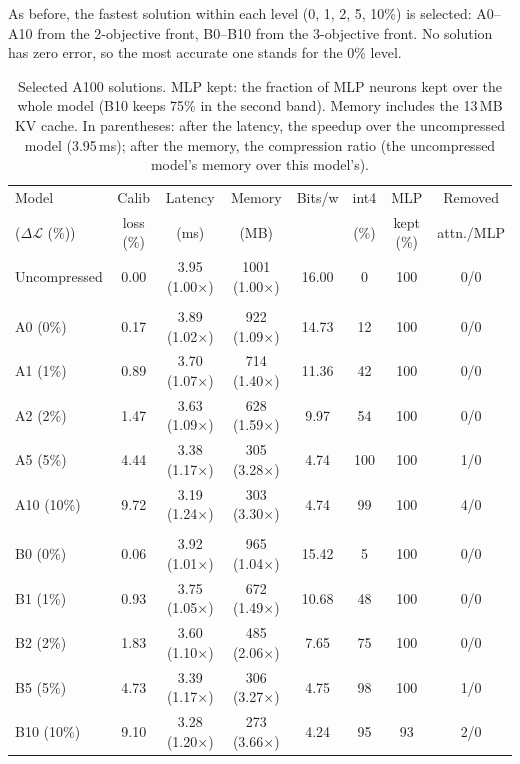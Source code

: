 \documentclass[11pt]{article}
\newcommand{\dloss}{\Delta\mathcal{L}}
\begin{document}
As before, the fastest solution within each level (0, 1, 2, 5, 10\%) is selected: A0--A10 from the
2-objective front, B0--B10 from the 3-objective front. No solution has zero error, so the most accurate
one stands for the 0\% level.

\begin{table}[!ht]
\centering
\scriptsize
\setlength{\tabcolsep}{3pt}
\begin{tabular}{lccccccc}
\toprule
Model & Calib & Latency & Memory & Bits/w & int4 & MLP & Removed \\
($\dloss$ (\%)) & loss (\%) & (ms) & (MB) & & (\%) & kept (\%) & attn./MLP \\
\midrule
Uncompressed & 0.00 & 3.95 (1.00$\times$) & 1001 (1.00$\times$) & 16.00 & 0 & 100 & 0/0 \\
\addlinespace
\multicolumn{8}{l}{\emph{2 objectives}} \\
A0  (0\%)  & 0.17 & 3.89 (1.02$\times$) & 922 (1.09$\times$) & 14.73 & 12  & 100 & 0/0 \\
A1  (1\%)  & 0.89 & 3.70 (1.07$\times$) & 714 (1.40$\times$) & 11.36 & 42  & 100 & 0/0 \\
A2  (2\%)  & 1.47 & 3.63 (1.09$\times$) & 628 (1.59$\times$) & 9.97  & 54  & 100 & 0/0 \\
A5  (5\%)  & 4.44 & 3.38 (1.17$\times$) & 305 (3.28$\times$) & 4.74  & 100 & 100 & 1/0 \\
A10 (10\%) & 9.72 & 3.19 (1.24$\times$) & 303 (3.30$\times$) & 4.74  & 99  & 100 & 4/0 \\
\addlinespace
\multicolumn{8}{l}{\emph{3 objectives}} \\
B0  (0\%)  & 0.06 & 3.92 (1.01$\times$) & 965 (1.04$\times$) & 15.42 & 5   & 100 & 0/0 \\
B1  (1\%)  & 0.93 & 3.75 (1.05$\times$) & 672 (1.49$\times$) & 10.68 & 48  & 100 & 0/0 \\
B2  (2\%)  & 1.83 & 3.60 (1.10$\times$) & 485 (2.06$\times$) & 7.65  & 75  & 100 & 0/0 \\
B5  (5\%)  & 4.73 & 3.39 (1.17$\times$) & 306 (3.27$\times$) & 4.75  & 98  & 100 & 1/0 \\
B10 (10\%) & 9.10 & 3.28 (1.20$\times$) & 273 (3.66$\times$) & 4.24  & 95  & 93  & 2/0 \\
\bottomrule
\end{tabular}
\caption{Selected A100 solutions. MLP kept: the fraction of MLP neurons kept over the whole model (B10
keeps 75\% in the second band). Memory includes the 13\,MB KV cache. In parentheses: after the latency, the
speedup over the uncompressed model (3.95\,ms); after the memory, the compression ratio (the uncompressed
model's memory over this model's).}
\label{tab:a100models}
\end{table}
\end{document}
